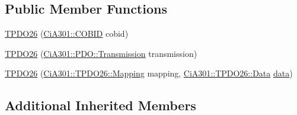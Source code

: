 \subsection*{Public Member Functions}
\begin{DoxyCompactItemize}
\item 
\hyperlink{struct_ci_a301_1_1_t_p_d_o26_a00727cc64d4d8cc30be1c358927c4289}{T\-P\-D\-O26} (\hyperlink{namespace_ci_a301_aec5b5dbb2b60d2837c60499f6f297aa7}{Ci\-A301\-::\-C\-O\-B\-I\-D} cobid)
\item 
\hyperlink{struct_ci_a301_1_1_t_p_d_o26_a2a1f5d95c45730150ae92d9ce8c506f9}{T\-P\-D\-O26} (\hyperlink{namespace_ci_a301_1_1_p_d_o_a6c7a5941fe4f869dd1703fb7ce7f6549}{Ci\-A301\-::\-P\-D\-O\-::\-Transmission} transmission)
\item 
\hyperlink{struct_ci_a301_1_1_t_p_d_o26_a801d3099d06ff1038ff5ea6af3c31af9}{T\-P\-D\-O26} (\hyperlink{struct_ci_a301_1_1_t_p_d_o26_ad26fbc2e8ca095342bf5ca3ad7b3a568}{Ci\-A301\-::\-T\-P\-D\-O26\-::\-Mapping} mapping, \hyperlink{struct_ci_a301_1_1_object_a9fd091097bb03da4a28a403485c3a10f}{Ci\-A301\-::\-T\-P\-D\-O26\-::\-Data} \hyperlink{struct_ci_a301_1_1_object_a73870d74c7ffaaf07515bf4a5d5330ea}{data})
\end{DoxyCompactItemize}
\subsection*{Additional Inherited Members}


